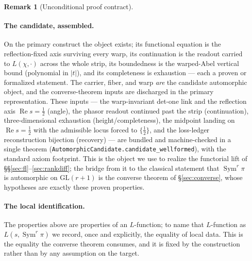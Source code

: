 \documentclass[11pt]{article}
\theoremstyle{definition}
\newtheorem{remark}[theorem]{Remark}
\renewcommand{\Re}{\operatorname{Re}}
\newcommand{\Sym}{\operatorname{Sym}}
\begin{document}
\begin{remark}[Unconditional proof contract]
\begin{enumerate}
\paragraph{The candidate, assembled.} On the primary construct the object exists; its functional
equation is the reflection-fixed axis surviving every warp, its continuation is the readout carried to
$L(\chi,\cdot)$ across the whole strip, its boundedness is the warped-Abel vertical bound (polynomial in
$|t|$), and its completeness is exhaustion --- each a proven or formalized statement. The carrier, fiber, and warp
\emph{are} the candidate automorphic object, and the converse-theorem inputs are discharged in the
primary representation. These inputs --- the warp-invariant det-one link and the reflection axis
$\Re s=\tfrac12$ (angle), the phasor readout continued past the strip (continuation), three-dimensional
exhaustion (height/completeness), the midpoint landing on $\Re s=\tfrac12$ with the admissible locus
forced to $\{\tfrac12\}$, and the loss-ledger reconstruction bijection (recovery) --- are bundled and
machine-checked in a single theorem (\texttt{AutomorphicCandidate.candidate\_wellformed}), with the
standard axiom footprint. This is the object we use to realize the functorial lift of
\S\S\ref{sec:fl}--\ref{sec:rankdiff}; the bridge from it to the classical statement that $\Sym^r\pi$ is
automorphic on $\mathrm{GL}(r+1)$ is the converse theorem of \S\ref{sec:converse}, whose hypotheses are
exactly these proven properties.

\paragraph{The local identification.} The properties above are properties of an $L$-function; to name
that $L$-function as $L(s,\Sym^r\pi)$ we record, once and explicitly, the equality of local data. This
is the equality the converse theorem consumes, and it is fixed by the construction rather than by any
assumption on the target.


\end{enumerate}
\end{remark}
\end{document}
